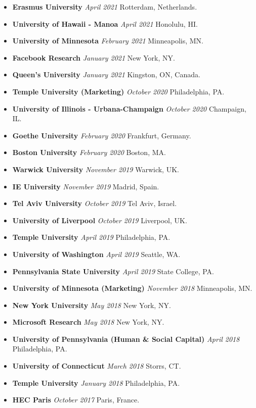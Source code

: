 \documentclass[10.5pt,letterpaper,sans]{moderncv}        %
\begin{document}
\begin{itemize}
\item \textbf{Erasmus University} \textit{April 2021} Rotterdam, Netherlands.
\item \textbf{University of Hawaii - Manoa} \textit{April 2021} Honolulu, HI.
\item \textbf{University of Minnesota} \textit{February 2021} Minneapolis, MN.
\item \textbf{Facebook Research} \textit{January 2021} New York, NY.
\item \textbf{Queen's University} \textit{January 2021} Kingston, ON, Canada.
\item \textbf{Temple University (Marketing)} \textit{October 2020} Philadelphia, PA.
\item \textbf{University of Illinois - Urbana-Champaign} \textit{October 2020} Champaign, IL.
\item \textbf{Goethe University} \textit{February 2020} Frankfurt, Germany.
\item \textbf{Boston University} \textit{February 2020} Boston, MA.
\item \textbf{Warwick University} \textit{November 2019} Warwick, UK.
\item \textbf{IE University} \textit{November 2019} Madrid, Spain.
\item \textbf{Tel Aviv University} \textit{October 2019} Tel Aviv, Israel.
\item \textbf{University of Liverpool} \textit{October 2019} Liverpool, UK.
\item \textbf{Temple University} \textit{April 2019} Philadelphia, PA.
\item \textbf{University of Washington} \textit{April 2019} Seattle, WA.
\item \textbf{Pennsylvania State University} \textit{April 2019} State College, PA.
\item \textbf{University of Minnesota (Marketing)} \textit{November 2018} Minneapolis, MN.
\item \textbf{New York University} \textit{May 2018} New York, NY.
\item \textbf{Microsoft Research} \textit{May 2018} New York, NY.
\item \textbf{University of Pennsylvania (Human \& Social Capital)} \textit{April 2018} Philadelphia, PA.
\item \textbf{University of Connecticut} \textit{March 2018} Storrs, CT.
\item \textbf{Temple University} \textit{January 2018} Philadelphia, PA.
\item \textbf{HEC Paris} \textit{October 2017} Paris, France.

\end{itemize}
\end{document}
